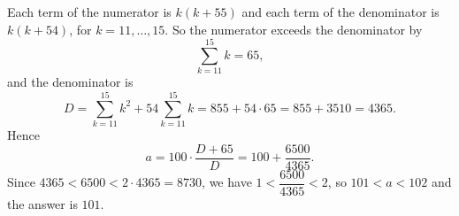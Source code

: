 Each term of the numerator is $k(k+55)$ and each term of the denominator is $k(k+54)$, for $k=11,\dots,15$. So the numerator exceeds the denominator by
\[\sum_{k=11}^{15}k=65,\]
and the denominator is
\[D=\sum_{k=11}^{15}k^2+54\sum_{k=11}^{15}k=855+54\cdot65=855+3510=4365.\]
Hence
\[a=100\cdot\dfrac{D+65}{D}=100+\dfrac{6500}{4365}.\]
Since $4365<6500<2\cdot4365=8730$, we have $1<\dfrac{6500}{4365}<2$, so $101<a<102$ and the answer is $\boxed{101}$.
